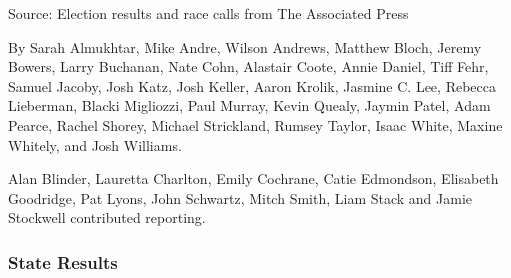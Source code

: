 Source: Election results and race calls from The Associated Press

By Sarah Almukhtar, Mike Andre, Wilson Andrews, Matthew Bloch, Jeremy
Bowers, Larry Buchanan, Nate Cohn, Alastair Coote, Annie Daniel, Tiff
Fehr, Samuel Jacoby, Josh Katz, Josh Keller, Aaron Krolik, Jasmine C.
Lee, Rebecca Lieberman, Blacki Migliozzi, Paul Murray, Kevin Quealy,
Jaymin Patel, Adam Pearce, Rachel Shorey, Michael Strickland, Rumsey
Taylor, Isaac White, Maxine Whitely, and Josh Williams.

Alan Blinder, Lauretta Charlton, Emily Cochrane, Catie Edmondson,
Elisabeth Goodridge, Pat Lyons, John Schwartz, Mitch Smith, Liam Stack
and Jamie Stockwell contributed reporting.

\hypertarget{state-results}{%
\subsubsection{State Results}\label{state-results}}

